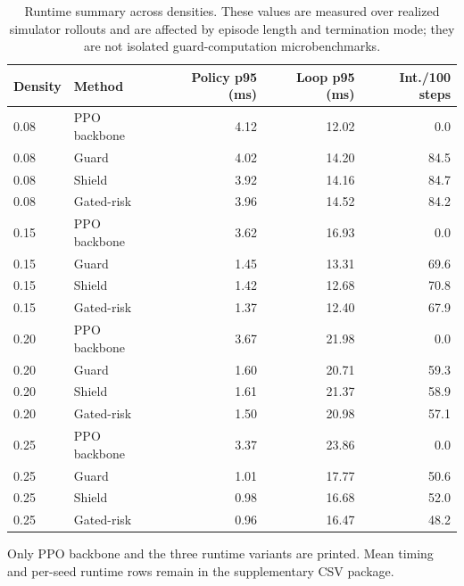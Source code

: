 \begin{table}[!htbp]
\centering
\caption{Runtime summary across densities. These values are measured over realized simulator rollouts and are affected by episode length and termination mode; they are not isolated guard-computation microbenchmarks.}
\label{tab_runtime_summary}
\scriptsize
\setlength{\tabcolsep}{3.0pt}
\renewcommand{\arraystretch}{1.08}
\begin{tabular}{@{}llrrr@{}}
\toprule
Density & Method & Policy p95 (ms) & Loop p95 (ms) & Int./100 steps \\
\midrule
0.08 & PPO backbone & 4.12 & 12.02 & 0.0 \\
0.08 & Guard & 4.02 & 14.20 & 84.5 \\
0.08 & Shield & 3.92 & 14.16 & 84.7 \\
0.08 & Gated-risk & 3.96 & 14.52 & 84.2 \\
0.15 & PPO backbone & 3.62 & 16.93 & 0.0 \\
0.15 & Guard & 1.45 & 13.31 & 69.6 \\
0.15 & Shield & 1.42 & 12.68 & 70.8 \\
0.15 & Gated-risk & 1.37 & 12.40 & 67.9 \\
0.20 & PPO backbone & 3.67 & 21.98 & 0.0 \\
0.20 & Guard & 1.60 & 20.71 & 59.3 \\
0.20 & Shield & 1.61 & 21.37 & 58.9 \\
0.20 & Gated-risk & 1.50 & 20.98 & 57.1 \\
0.25 & PPO backbone & 3.37 & 23.86 & 0.0 \\
0.25 & Guard & 1.01 & 17.77 & 50.6 \\
0.25 & Shield & 0.98 & 16.68 & 52.0 \\
0.25 & Gated-risk & 0.96 & 16.47 & 48.2 \\
\bottomrule
\end{tabular}
\begin{tablenotes}
\item Only PPO backbone and the three runtime variants are printed. Mean timing and per-seed runtime rows remain in the supplementary CSV package.
\end{tablenotes}
\end{table}
